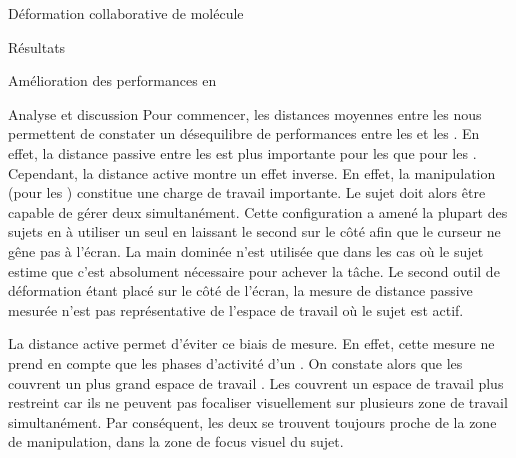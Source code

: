 \documentclass[myfrancais,ngerman,english,frenchb]{mythesis}
\begin{document}
\begin{mychapter}{Déformation collaborative de molécule}
\begin{mysection}{Résultats}
\begin{mysubsection}{Amélioration des performances en }
\begin{mysubsubsection}{Analyse et discussion}
					Pour commencer, les distances moyennes entre les  nous permettent de constater un désequilibre de performances entre les  et les  .
					En effet, la distance passive entre les  est plus importante pour les  que pour les .
					Cependant, la distance active montre un effet inverse.
					En effet, la manipulation  (pour les ) constitue une charge de travail importante.
					Le sujet doit alors être capable de gérer deux  simultanément.
					Cette configuration a amené la plupart des sujets en  à utiliser un seul  en laissant le second sur le côté afin que le curseur ne gêne pas à l'écran.
					La main dominée n'est utilisée que dans les cas où le sujet estime que c'est absolument nécessaire pour achever la tâche.
					Le second outil de déformation étant placé sur le côté de l'écran, la mesure de distance passive mesurée n'est pas représentative de l'espace de travail où le sujet est actif.

					La distance active permet d'éviter ce biais de mesure.
					En effet, cette mesure ne prend en compte que les phases d'activité d'un .
					On constate alors que les  couvrent un plus grand espace de travail .
					Les  couvrent un espace de travail plus restreint car ils ne peuvent pas focaliser visuellement sur plusieurs zone de travail simultanément.
					Par conséquent, les deux  se trouvent toujours proche de la zone de manipulation, dans la zone de focus visuel du sujet.


\end{mysubsubsection}
\end{mysubsection}
\end{mysection}
\end{mychapter}
\end{document}
